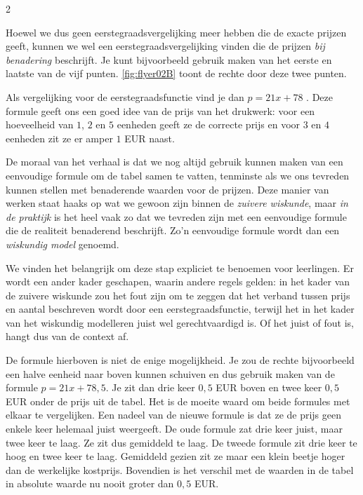 \begin{multicols}{2}

Hoewel we dus geen eerstegraadsvergelijking meer hebben die de exacte prijzen geeft, kunnen we wel een eerstegraadsvergelijking vinden die de prijzen \emph{bij benadering} beschrijft. Je kunt bijvoorbeeld gebruik maken van het eerste en laatste van de vijf punten. \autoref{fig:flyer02B} toont de rechte door deze twee punten.


Als vergelijking voor de eerstegraadsfunctie vind je dan $p=21x+78$ . Deze formule geeft ons een goed idee van de prijs van het drukwerk: voor een hoeveelheid van $1$, $2$ en $5$ eenheden geeft ze de correcte prijs en voor $3$ en $4$ eenheden zit ze er amper $1$ EUR naast.

De moraal van het verhaal is dat we nog altijd gebruik kunnen maken van een eenvoudige formule om de tabel samen te vatten, tenminste als we ons tevreden kunnen stellen met benaderende waarden voor de prijzen. Deze manier van werken staat haaks op wat we gewoon zijn binnen de \emph{zuivere wiskunde}, maar \emph{in de praktijk} is het heel vaak zo dat we tevreden zijn met een eenvoudige formule die de realiteit benaderend beschrijft. Zo’n eenvoudige formule wordt dan een \emph{wiskundig model} genoemd.

We vinden het belangrijk om deze stap expliciet te benoemen voor leerlingen. Er wordt een ander kader geschapen, waarin andere regels gelden: in het kader van de zuivere wiskunde zou het fout zijn om te zeggen dat het verband tussen prijs en aantal beschreven wordt door een eerstegraadsfunctie, terwijl het in het kader van het wiskundig modelleren juist wel gerechtvaardigd is. Of het juist of fout is, hangt dus van de context af.

De formule hierboven is niet de enige mogelijkheid. Je zou de rechte bijvoorbeeld een halve eenheid naar boven kunnen schuiven en dus gebruik maken van de formule $p=21x+78,5$. Je zit dan drie keer $0,5$ EUR boven en twee keer $0,5$ EUR onder de prijs uit de tabel. Het is de moeite waard om beide formules met elkaar te vergelijken. Een nadeel van de nieuwe formule is dat ze de prijs geen enkele keer helemaal juist weergeeft. De oude formule zat drie keer juist, maar twee keer te laag. Ze zit dus gemiddeld te laag. De tweede formule zit drie keer te hoog en twee keer te laag. Gemiddeld gezien zit ze maar een klein beetje hoger dan de werkelijke kostprijs. Bovendien is het verschil met de waarden in de tabel in absolute waarde nu nooit groter dan $0,5$ EUR.


\end{multicols}
